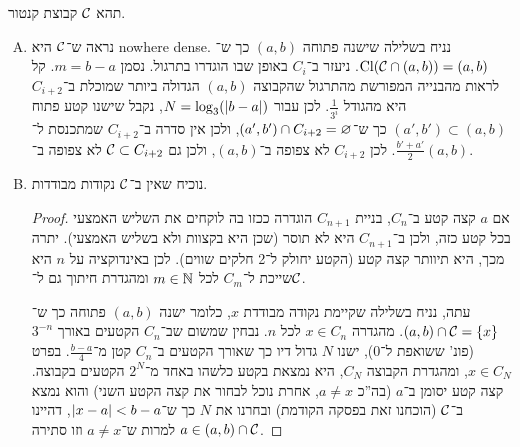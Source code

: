 \documentclass[]{../../../../tex/classes/homework}
\begin{document}
	\section{}
	תהא $\mathcal{C}$ קבוצת קנטור. 
	\begin{enumerate}[(A)]
		\item נראה ש־$\mathcal{C}$ היא nowhere dense. נניח בשלילה שישנה פתוחה $(a, b)$ כך ש־$\operatorname{Cl}(\mathcal{C} \cap (a, b)) = (a, b)$. ניעזר ב־$C_i$ באופן שבו הוגדרו בתרגול. נסמן $m = b - a$. 
		קל לראות מהבנייה המפורשת מהתרגול שהקבוצה $(a, b)$ הגדולה ביותר שמוכלת ב־$C_{i + 2}$ היא מהגודל $\frac{1}{3^{i}}$. לכן עבור $N = \log_3(\left \lvert b - a \right \rvert)$, נקבל שישנו קטע פתוח $(a', b') \subset (a, b)$ כך ש־$(a', b') \cap C_{i + 2} = \varnothing$, ולכן אין סדרה ב־$C_{i + 2}$ שמתכנסת ל־$\frac{b' + a'}{2}$. לכן $C_{i + 2}$ לא צפופה ב־$(a, b)$, ולכן גם $\mathcal{C} \subset C_{i + 2}$ לא צפופה ב־$(a, b)$. 
		\item נוכיח שאין ב־$\mathcal{C}$ נקודות מבודדות. \begin{proof}
			אם $a$ קצה קטע ב־$C_n$, בניית $C_{n + 1}$ הוגדרה ככזו בה לוקחים את השליש האמצעי בכל קטע כזה, ולכן ב־$C_{n + 1}$ היא לא תוסר (שכן היא בקצוות ולא בשליש האמצעי). יתרה מכך, היא תיוותר קצה קטע (הקטע יחולק ל־2 חלקים שווים). לכן באינדוקציה על $n$ היא שייכת ל־$C_m$ לכל $m \in \mathbb{N}$ ומהגדרת חיתוך גם ל־$\mathcal{C}$. 
			
			עתה, נניח בשלילה שקיימת נקודה מבודדת $x$, כלומר ישנה $(a, b)$ פתוחה כך ש־$(a, b) \cap \mathcal{C} = \{x\}$. מהגדרה $x \in C_n$ לכל $n$. נבחין שמשום שב־$C_n$ הקטעים באורך $3^{-n}$ (פונ' ששואפת ל־$0$), ישנו $N$ גדול דיו כך שאורך הקטעים ב־$C_n$ קטן מ־$\frac{b - a}{4}$. בפרט $x \in C_N$, ומהגדרת הקבוצה $C_N$, היא נמצאת בקטע כלשהו באחד מ־$2^{N}$ הקטעים בקבוצה. קצה קטע יסומן ב־$a$ (בה''כ $a \neq x$, אחרת נוכל לבחור את קצה הקטע השני) והוא נמצא ב־$\mathcal{C}$ (הוכחנו זאת בפסקה הקודמת) ובחרנו את $N$ כך ש־$\left \lvert x - a \right \rvert < b - a$, דהיינו $a \in (a, b) \cap \mathcal{C}$ למרות ש־$a \neq x$ וזו סתירה. 
		\end{proof}
	\end{enumerate}
	
\end{document}
